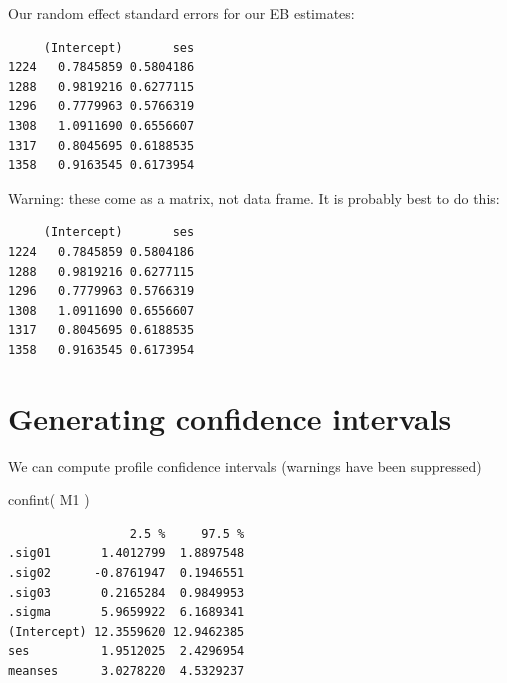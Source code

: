 \documentclass[
  letterpaper,
  DIV=11,
  numbers=noendperiod]{scrreprt}
\newenvironment{Shaded}{}{}
\newcommand{\FunctionTok}[1]{\textcolor[rgb]{0.02,0.16,0.49}{#1}}
\newcommand{\NormalTok}[1]{#1}
\newcommand{\OtherTok}[1]{\textcolor[rgb]{0.00,0.44,0.13}{#1}}
\newcommand{\SpecialCharTok}[1]{\textcolor[rgb]{0.25,0.44,0.63}{#1}}
\begin{document}
Our random effect standard errors for our EB estimates:

\begin{Shaded}
\end{Shaded}

\begin{verbatim}
     (Intercept)       ses
1224   0.7845859 0.5804186
1288   0.9819216 0.6277115
1296   0.7779963 0.5766319
1308   1.0911690 0.6556607
1317   0.8045695 0.6188535
1358   0.9163545 0.6173954
\end{verbatim}

Warning: these come as a matrix, not data frame. It is probably best to
do this:

\begin{Shaded}
\end{Shaded}

\begin{verbatim}
     (Intercept)       ses
1224   0.7845859 0.5804186
1288   0.9819216 0.6277115
1296   0.7779963 0.5766319
1308   1.0911690 0.6556607
1317   0.8045695 0.6188535
1358   0.9163545 0.6173954
\end{verbatim}

\section{Generating confidence
intervals}\label{generating-confidence-intervals}

We can compute profile confidence intervals (warnings have been
suppressed)

\begin{Shaded}
\begin{Highlighting}[]
\FunctionTok{confint}\NormalTok{( M1 )}
\end{Highlighting}
\end{Shaded}

\begin{verbatim}
                 2.5 %     97.5 %
.sig01       1.4012799  1.8897548
.sig02      -0.8761947  0.1946551
.sig03       0.2165284  0.9849953
.sigma       5.9659922  6.1689341
(Intercept) 12.3559620 12.9462385
ses          1.9512025  2.4296954
meanses      3.0278220  4.5329237
\end{verbatim}
\end{document}
